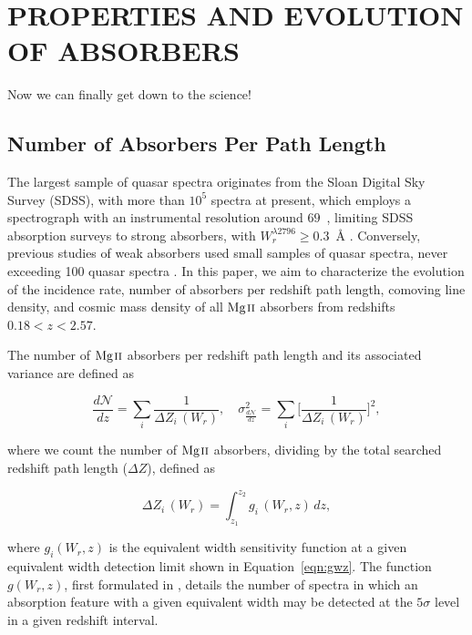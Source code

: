 \section{\MakeUppercase{Properties and Evolution of {\MgII} Absorbers}}
\label{ch5}

Now we can finally get down to the science!

\subsection{Number of Absorbers Per Path Length}
\label{ch5:dndx}


The largest sample of quasar spectra originates from the Sloan Digital Sky Survey (SDSS), with more than $10^5$ spectra at present, which employs a spectrograph with an instrumental resolution around $69$~{\kms}, limiting SDSS absorption surveys to strong absorbers, with $W_r^{\lambda2796} \ge 0.3$~{\AA} \citep{Nestor2005,Zhu2013}. Conversely, previous studies of weak absorbers used small samples of quasar spectra, never exceeding 100 quasar spectra \citep{Steidel1992,Narayanan2007,Kacprzak2011}. In this paper, we aim to characterize the evolution of the incidence rate, number of absorbers per redshift path length, comoving line density, and cosmic mass density of all ${\hbox{{\rm Mg}\kern 0.1em{\sc ii}}}$ absorbers from redshifts $0.18 < z < 2.57$.

The number of ${\hbox{{\rm Mg}\kern 0.1em{\sc ii}}}$ absorbers per redshift path length and its associated variance are defined as

\begin{equation}
\frac{d \mathcal{N}}{d z} = \sum_{i}\frac{1}{\Delta Z_i\,(W_r)},\quad \sigma^2_{\frac{d \mathcal{N}}{d z}} = \sum_{i} \Big[\frac{1}{\Delta Z_i\,(W_r)}\Big]^2,
\label{eqn:dndz}
\end{equation}

\noindent
where we count the number of ${\hbox{{\rm Mg}\kern 0.1em{\sc ii}}}$ absorbers, dividing by the total searched redshift path length ($\Delta Z$), defined as

\begin{equation}
\Delta Z_i\,(W_r) = \int_{z_1}^{z_2} g_i\,(W_r, z)\,dz,
\label{eqn:deltaz}
\end{equation}

\noindent
where $g_i(W_r, z)$ is the equivalent width sensitivity function at a given equivalent width detection limit shown in Equation~\ref{eqn:gwz}. The function $g(W_r, z)$, first formulated in \cite{Lanzetta1987}, details the number of spectra in which an absorption feature with a given equivalent width may be detected at the $5\sigma$ level in a given redshift interval.

